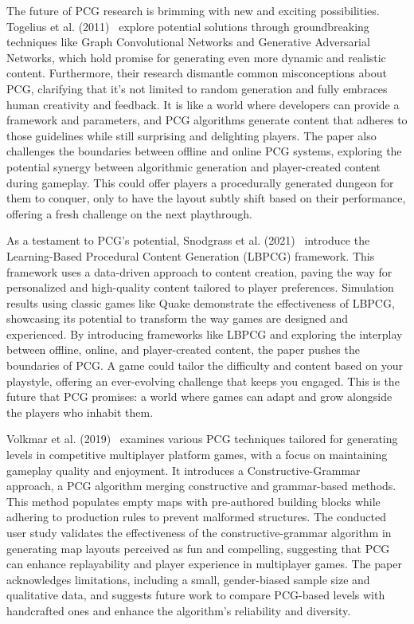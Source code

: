 \documentclass[runningheads]{llncs}
\begin{document}
The future of PCG research is brimming with new and exciting possibilities. Togelius et al. (2011)~\cite{ref_article9} explore potential solutions through groundbreaking techniques like Graph Convolutional Networks and Generative Adversarial Networks, which hold promise for generating even more dynamic and realistic content.  Furthermore, their research dismantle common misconceptions about PCG, clarifying that it's not limited to random generation and fully embraces human creativity and feedback. It is like a world where developers can provide a framework and parameters, and PCG algorithms generate content that adheres to those guidelines while still surprising and delighting players. The paper also challenges the boundaries between offline and online PCG systems, exploring the potential synergy between algorithmic generation and player-created content during gameplay. This could offer players a procedurally generated dungeon for them to conquer, only to have the layout subtly shift based on their performance, offering a fresh challenge on the next playthrough.

As a testament to PCG's potential, Snodgrass et al. (2021)~\cite{ref_article18} introduce the Learning-Based Procedural Content Generation (LBPCG) framework. This framework uses a data-driven approach to content creation, paving the way for personalized and high-quality content tailored to player preferences.  Simulation results using classic games like Quake demonstrate the effectiveness of LBPCG, showcasing its potential to transform the way games are designed and experienced.  By introducing frameworks like LBPCG and exploring the interplay between offline, online, and player-created content, the paper pushes the boundaries of PCG. A game could tailor the difficulty and content based on your playstyle, offering an ever-evolving challenge that keeps you engaged. This is the future that PCG promises: a world where games can adapt and grow alongside the players who inhabit them.

Volkmar et al. (2019)~\cite{ref_article13} examines various PCG techniques tailored for generating levels in competitive multiplayer platform games, with a focus on maintaining gameplay quality and enjoyment. It introduces a Constructive-Grammar approach, a PCG algorithm merging constructive and grammar-based methods. This method populates empty maps with pre-authored building blocks while adhering to production rules to prevent malformed structures. The conducted user study validates the effectiveness of the constructive-grammar algorithm in generating map layouts perceived as fun and compelling, suggesting that PCG can enhance replayability and player experience in multiplayer games. The paper acknowledges limitations, including a small, gender-biased sample size and qualitative data, and suggests future work to compare PCG-based levels with handcrafted ones and enhance the algorithm's reliability and diversity.
\end{document}
